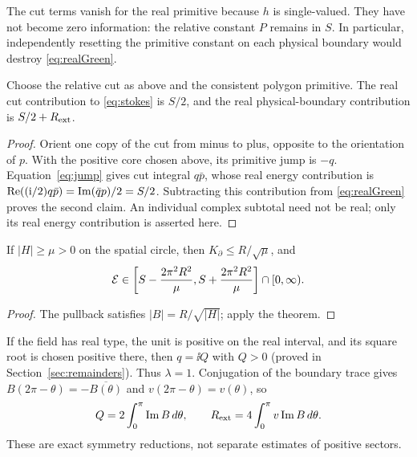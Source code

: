 \begin{remark}
The cut terms vanish for the real primitive because $h$ is single-valued.
They have not become zero information: the relative constant $P$ remains
in $S$. In particular, independently resetting the primitive constant on
each physical boundary would destroy \eqref{eq:realGreen}.
\end{remark}

\begin{proposition}
\label{prop:cutallocation}
Choose the relative cut as above and the consistent polygon primitive.
The real cut contribution to \eqref{eq:stokes} is $S/2$, and the real
physical-boundary contribution is $S/2+R_{\mathrm{ext}}$.
\end{proposition}
\begin{proof}
Orient one copy of the cut from minus to plus, opposite to the orientation
of $p$. With the positive core chosen above, its primitive jump is $-q$.
Equation~\eqref{eq:jump} gives cut integral $q\bar p$, whose real energy
contribution is
$\operatorname{Re}((\mathrm i/2)q\bar p)=\operatorname{Im}(\bar q p)/2=S/2$.
Subtracting this contribution from \eqref{eq:realGreen} proves the second
claim. An individual complex subtotal need not be real; only its real
energy contribution is asserted here.
\end{proof}

\begin{corollary}
If $|H|\ge\mu>0$ on the spatial circle, then
$K_\partial\le R/\sqrt\mu$, and
\begin{equation}\label{eq:periodInterval}
 \mathcal E\in\left[S-\frac{2\pi^2R^2}{\mu},
             S+\frac{2\pi^2R^2}{\mu}\right]\cap[0,\infty).
\end{equation}
\end{corollary}
\begin{proof}
The pullback satisfies $|B|=R/\sqrt{|H|}$; apply the theorem.
\end{proof}

If the field has real type, the unit is positive on the real interval,
and its square root is chosen positive there, then $q=\ii Q$ with
$Q>0$ (proved in Section~\ref{sec:remainders}). Thus $\lambda=1$.
Conjugation of the boundary trace gives
$B(2\pi-\theta)=-\overline{B(\theta)}$ and
$v(2\pi-\theta)=v(\theta)$, so
\begin{equation}\label{eq:halfboundary}
 Q=2\int_0^\pi\operatorname{Im} B\,d\theta,\qquad
 R_{\mathrm{ext}}=4\int_0^\pi v\operatorname{Im} B\,d\theta.
\end{equation}
These are exact symmetry reductions, not separate estimates of positive
sectors.
